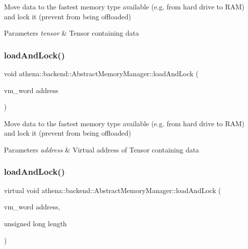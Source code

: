 Move data to the fastest memory type available (e.\+g. from hard drive to R\+AM) and lock it (prevent from being offloaded) 
\begin{DoxyParams}{Parameters}
{\em tensor} & Tensor containing data \\
\hline
\end{DoxyParams}
\mbox{\label{classathena_1_1backend_1_1_abstract_memory_manager_a47ea5a77f81f91f803f748720c5c19b5}} 
\subsubsection{\texorpdfstring{load\+And\+Lock()}{loadAndLock()}\hspace{0.1cm}{\footnotesize\ttfamily [2/3]}}
{\footnotesize\ttfamily void athena\+::backend\+::\+Abstract\+Memory\+Manager\+::load\+And\+Lock (\begin{DoxyParamCaption}\item[{vm\+\_\+word}]{address }\end{DoxyParamCaption})}

Move data to the fastest memory type available (e.\+g. from hard drive to R\+AM) and lock it (prevent from being offloaded) 
\begin{DoxyParams}{Parameters}
{\em address} & Virtual address of Tensor containing data \\
\hline
\end{DoxyParams}
\mbox{\label{classathena_1_1backend_1_1_abstract_memory_manager_a9fe52e4020802d6f526fba06adce8407}} 
\subsubsection{\texorpdfstring{load\+And\+Lock()}{loadAndLock()}\hspace{0.1cm}{\footnotesize\ttfamily [3/3]}}
{\footnotesize\ttfamily virtual void athena\+::backend\+::\+Abstract\+Memory\+Manager\+::load\+And\+Lock (\begin{DoxyParamCaption}\item[{vm\+\_\+word}]{address,  }\item[{unsigned long}]{length }\end{DoxyParamCaption})\hspace{0.3cm}{\ttfamily [pure virtual]}}

